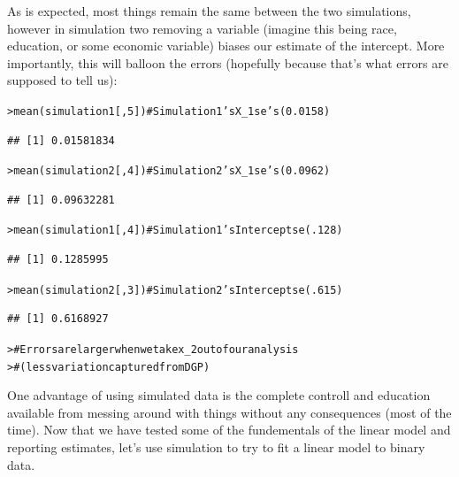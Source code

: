 \documentclass[12pt]{article}\usepackage[]{graphicx}\usepackage[]{color}
\makeatletter
\newcommand{\hlnum}[1]{\textcolor[rgb]{0.82,0.78,0.62}{#1}}%
\newcommand{\hlcom}[1]{\textcolor[rgb]{0.404,0.408,0.42}{#1}}%
\newcommand{\hlstd}[1]{\textcolor[rgb]{0.882,0.878,0.898}{#1}}%
\newcommand{\hlkwd}[1]{\textcolor[rgb]{0.733,0.388,0.812}{#1}}%
\newenvironment{kframe}{%
 \def\at@end@of@kframe{}%
 \ifinner\ifhmode%
  \def\at@end@of@kframe{\end{minipage}}%
  \begin{minipage}{\columnwidth}%
 \fi\fi%
 \def\FrameCommand##1{\hskip\@totalleftmargin \hskip-\fboxsep
 \colorbox{shadecolor}{##1}\hskip-\fboxsep
     \hskip-\linewidth \hskip-\@totalleftmargin \hskip\columnwidth}%
 \MakeFramed {\advance\hsize-\width
   \@totalleftmargin\z@ \linewidth\hsize
   \@setminipage}}%
 {\par\unskip\endMakeFramed%
 \at@end@of@kframe}
\newenvironment{knitrout}{}{} %
\makeatother
\begin{document}
\begin{flushleft}
\begin{center}
\begin{knitrout}
\end{knitrout}
\end{center}

As is expected, most things remain the same between the two simulations, however in simulation two removing a variable (imagine this being race, education, or some economic variable) biases our estimate of the intercept. More importantly, this will balloon the errors (hopefully because that's what errors are supposed to tell us): 

\begin{knitrout}
\color{fgcolor}\begin{kframe}
\begin{alltt}
\hlstd{> }\hlkwd{mean}\hlstd{(simulation1[,}\hlnum{5}\hlstd{])} \hlcom{# Simulation 1's X_1 se's (0.0158)}
\end{alltt}
\begin{verbatim}
## [1] 0.01581834
\end{verbatim}
\begin{alltt}
\hlstd{> }\hlkwd{mean}\hlstd{(simulation2[,}\hlnum{4}\hlstd{])} \hlcom{# Simulation 2's X_1 se's (0.0962)}
\end{alltt}
\begin{verbatim}
## [1] 0.09632281
\end{verbatim}
\begin{alltt}
\hlstd{> }\hlkwd{mean}\hlstd{(simulation1[,}\hlnum{4}\hlstd{])}  \hlcom{# Simulation 1's Intercept se (.128)}
\end{alltt}
\begin{verbatim}
## [1] 0.1285995
\end{verbatim}
\begin{alltt}
\hlstd{> }\hlkwd{mean}\hlstd{(simulation2[,}\hlnum{3}\hlstd{])}  \hlcom{# Simulation 2's Intercept se (.615)}
\end{alltt}
\begin{verbatim}
## [1] 0.6168927
\end{verbatim}
\begin{alltt}
\hlstd{> }\hlcom{# Errors are larger when we take x_2 out of our analysis}
\hlstd{> }\hlcom{#   (less variation captured from DGP)}
\end{alltt}
\end{kframe}
\end{knitrout}

One advantage of using simulated data is the complete controll and education available from messing around with things without any consequences (most of the time). Now that we have tested some of the fundementals of the linear model and reporting estimates, let's use simulation to try to fit a linear model to binary data.


\end{flushleft}
\end{document}
